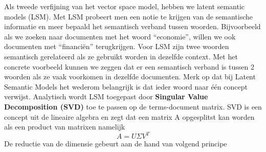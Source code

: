Als tweede verfijning van het vector space model, hebben we latent semantic models (LSM). Met LSM probeert men een notie te krijgen van de semantische informatie en meer bepaald het semantisch verband tussen woorden. Bijvoorbeeld als we zoeken naar documenten met het woord ``economie'', willen we ook documenten met ``financi\"en'' terugkrijgen. Voor LSM zijn twee woorden semantisch gerelateerd als ze gebruikt worden in dezelfde context. Met het concrete voorbeeld kunnen we zeggen dat er een semantisch verband is tussen 2 woorden als ze vaak voorkomen in dezelfde documenten.
\newline
Merk op dat bij Latent Semantic Models het wederom belangrijk is dat ieder woord naar \'e\'en concept verwijst.
%
\newline
Analytisch wordt LSM toegepast door \textbf{Singular Value Decomposition (SVD)} toe te passen op de terms-document matrix. SVD is een concept uit de lineaire algebra en zegt dat een matrix A opgesplitst kan worden als een product van matrixen namelijk \\
\[A = U\Sigma V^T \]
De reductie van de dimensie gebeurt aan de hand van volgend principe
%
\newcommand{\vect}{\mathbf}
\newcommand{\nul}{\operatorname{Nul}}
\newcommand{\col}{\operatorname{Kolommen }}
\newcommand{\row}{\operatorname{Rijen}}

